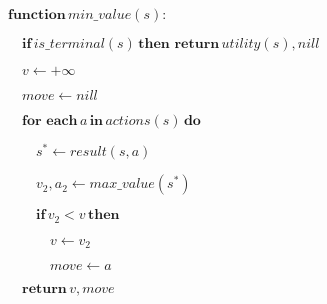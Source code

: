 \documentclass[preview]{standalone}
\begin{document}
\begin{center}
$\textbf{function} \, min\_value(s):$
        
        $\quad \textbf{if} \, is\_terminal(s) \, \textbf{then return} \, utility(s), nill$
        
        $\quad v \leftarrow +\infty$

$\quad move \leftarrow nill$

$\quad \textbf{for each} \, a \, \textbf{in} \, actions(s) \, \textbf{do}$

$\qquad s^* \leftarrow result(s, a)$

$\qquad v_2, a_2 \leftarrow max\_value(s^*)$

$\qquad \textbf{if} \, v_2 < v \, \textbf{then}$

$\qquad \quad v \leftarrow v_2$

$\qquad \quad move \leftarrow a$

$\quad \textbf{return} \, v, move$
\end{center}
\end{document}
